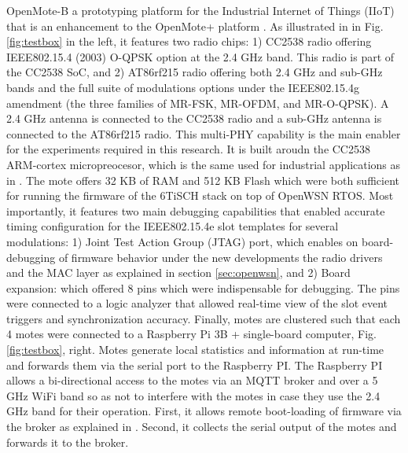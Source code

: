 \documentclass[journal]{IEEEtran}
\begin{document}

OpenMote-B a prototyping platform for the Industrial Internet of Things (IIoT) that is an enhancement to the OpenMote+ platform \cite{tusetopenmote}. 
As illustrated in in Fig. \ref{fig:testbox} in the left,  it features two radio chips: 
	1) CC2538 radio offering IEEE802.15.4 (2003) O-QPSK option at the 2.4 GHz band. This radio is part of the CC2538 SoC, and 
    2) AT86rf215 radio offering both 2.4 GHz and sub-GHz bands and the full suite of modulations options under the IEEE802.15.4g amendment (the three families of MR-FSK, MR-OFDM, and MR-O-QPSK). 
A 2.4 GHz antenna is connected to the CC2538 radio and a sub-GHz antenna is connected to the AT86rf215 radio.
This multi-PHY capability is the main enabler for the experiments required in this research. 
It is built aroudn the CC2538 ARM-cortex micropreocesor, which is the same used for industrial applications as in \cite{civerchia17industrial}.
The mote offers 32 KB of RAM and 512 KB Flash which were both sufficient for running the firmware of the 6TiSCH stack on top of OpenWSN RTOS. 
Most importantly, it features two main debugging capabilities that enabled accurate timing configuration for the IEEE802.15.4e slot templates for several modulations:
1) Joint Test Action Group (JTAG) port, which enables on board-debugging of firmware behavior under the new developments the radio drivers and the MAC layer as explained in section \ref{sec:openwsn}, and 
2) Board expansion: which offered 8 pins which were indispensable for debugging. The pins were connected to a logic analyzer that allowed real-time view of the slot event triggers and synchronization accuracy.
Finally, motes are clustered such that each 4 motes were connected to a Raspberry Pi 3B + single-board computer, Fig. \ref{fig:testbox}, right.
Motes generate local statistics and information at run-time and forwards them via the serial port to the Raspberry PI. 
The Raspberry PI allows a bi-directional access to the motes via an MQTT broker and over a 5 GHz WiFi band so as not to interfere with the motes in case they use the 2.4 GHz band for their operation.
First, it allows remote boot-loading of firmware via the broker as explained in \cite{munoz19opentestbed}.
Second, it collects the serial output of the motes and forwards it to the  broker. 
\end{document}

